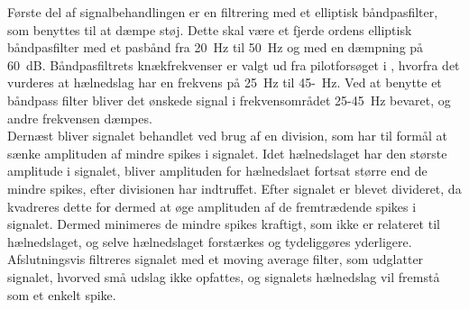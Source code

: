 Første del af signalbehandlingen er en filtrering med et elliptisk båndpasfilter, som benyttes til at dæmpe støj. Dette skal være et fjerde ordens elliptisk båndpasfilter med et pasbånd fra 20~Hz til 50~Hz og med en dæmpning på 60~dB. Båndpasfiltrets knækfrekvenser er valgt ud fra pilotforsøget i , hvorfra det vurderes at hælnedslag har en frekvens på 25~Hz til 45-~Hz. Ved at benytte et båndpass filter bliver det ønskede signal i frekvensområdet 25-45~Hz bevaret, og andre frekvensen dæmpes.\\
Dernæst bliver signalet behandlet ved brug af en division, som har til formål at sænke amplituden af mindre spikes i signalet. Idet hælnedslaget har den største amplitude i signalet, bliver amplituden for hælnedslaet fortsat større end de mindre spikes, efter divisionen har indtruffet. Efter signalet er blevet divideret, da kvadreres dette for dermed at øge amplituden af de fremtrædende spikes i signalet. Dermed minimeres de mindre spikes kraftigt, som ikke er relateret til hælnedslaget, og selve hælnedslaget forstærkes og tydeliggøres yderligere. Afslutningsvis filtreres signalet med et moving average filter, som udglatter signalet, hvorved små udslag ikke opfattes, og signalets hælnedslag vil fremstå som et enkelt spike.


